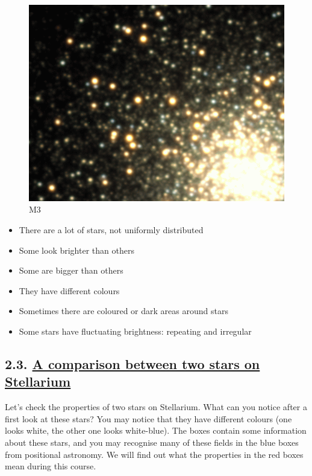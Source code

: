 \documentclass[
  letterpaper,
  DIV=11,
  numbers=noendperiod]{scrartcl}
\providecommand{\tightlist}{%
  \setlength{\itemsep}{0pt}\setlength{\parskip}{0pt}}\usepackage{longtable,booktabs,array}
\begin{document}
\begin{figure}

{\centering \includegraphics{img/M3_color3.gif}

}

\caption{M3}

\end{figure}

\begin{itemize}
\tightlist
\item
  There are a lot of stars, not uniformly distributed
\item
  Some look brighter than others
\item
  Some are bigger than others
\item
  They have different colours
\item
  Sometimes there are coloured or dark areas around stars
\item
  Some stars have fluctuating brightness: repeating and irregular
\end{itemize}

\hypertarget{a-comparison-between-two-stars-on-stellarium}{%
\subsection{\texorpdfstring{2.3. \protect\hyperlink{toc0_}{A comparison
between two stars on
Stellarium}}{2.3. A comparison between two stars on Stellarium}}\label{a-comparison-between-two-stars-on-stellarium}}

Let's check the properties of two stars on Stellarium. What can you
notice after a first look at these stars? You may notice that they have
different colours (one looks white, the other one looks white-blue). The
boxes contain some information about these stars, and you may recognise
many of these fields in the blue boxes from positional astronomy. We
will find out what the properties in the red boxes mean during this
course.
\end{document}
